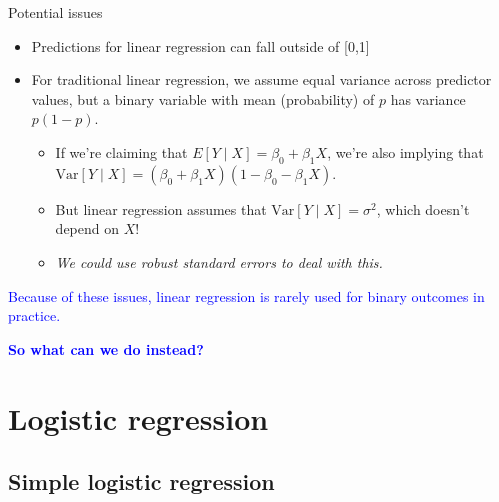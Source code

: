 \documentclass[10pt,t]{beamer}
\begin{document}
\begin{frame}{Potential issues}
	
	\begin{itemize}
	\item Predictions for linear regression can fall outside of [0,1]
	
	\medskip
	
	\item For traditional linear regression, we assume equal variance across predictor values, but a binary variable with mean (probability) of $p$ has variance $p(1-p)$. 
	\medskip
	\begin{itemize}
	\item  If we're claiming that $E[Y \mid X] = \beta_0 + \beta_1X$, we're also implying that $\text{Var}[Y \mid X] = (\beta_0 + \beta_1 X)(1 - \beta_0 - \beta_1 X)$. 
	\medskip
	
	\item But linear regression assumes that $\text{Var}[Y \mid X] = \sigma^2$, which doesn't depend on $X$!
	
	\medskip
	
	\item \textit{We could use robust standard errors to deal with this.}
	

	\end{itemize}
\end{itemize}
\medskip

\textcolor{blue}{Because of these issues, linear regression is rarely used for binary outcomes in practice.}

\medskip

\textcolor{blue}{\textbf{So what can we do instead?}}

\end{frame}


%
%
\section{Logistic regression}

\subsection{Simple logistic regression}

%	
%	
%	
%	
%	
%	
%		
%
%	
\end{document}
